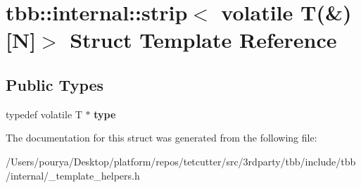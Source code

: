 \hypertarget{structtbb_1_1internal_1_1strip_3_01volatile_01T_07_6_08[N]_4}{}\section{tbb\+:\+:internal\+:\+:strip$<$ volatile T(\&)\mbox{[}N\mbox{]}$>$ Struct Template Reference}
\label{structtbb_1_1internal_1_1strip_3_01volatile_01T_07_6_08[N]_4}
\subsection*{Public Types}
\begin{DoxyCompactItemize}
\item 
\hypertarget{structtbb_1_1internal_1_1strip_3_01volatile_01T_07_6_08[N]_4_afffd41a5991c0e9b0ee1f8c4b35c276a}{}typedef volatile T $\ast$ {\bfseries type}\label{structtbb_1_1internal_1_1strip_3_01volatile_01T_07_6_08[N]_4_afffd41a5991c0e9b0ee1f8c4b35c276a}

\end{DoxyCompactItemize}


The documentation for this struct was generated from the following file\+:\begin{DoxyCompactItemize}
\item 
/\+Users/pourya/\+Desktop/platform/repos/tetcutter/src/3rdparty/tbb/include/tbb/internal/\+\_\+template\+\_\+helpers.\+h\end{DoxyCompactItemize}
